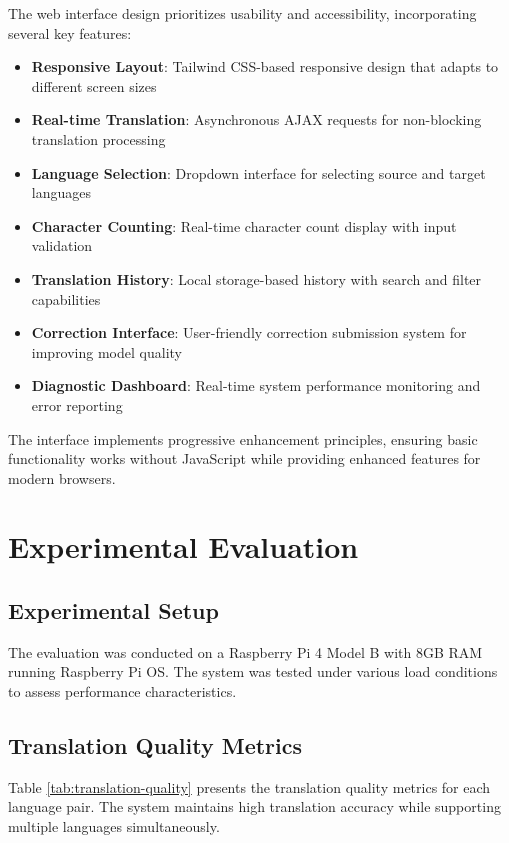 \documentclass[conference]{IEEEtran}
\begin{document}
The web interface design prioritizes usability and accessibility, incorporating several key features:

\begin{itemize}
    \item \textbf{Responsive Layout}: Tailwind CSS-based responsive design that adapts to different screen sizes
    \item \textbf{Real-time Translation}: Asynchronous AJAX requests for non-blocking translation processing
    \item \textbf{Language Selection}: Dropdown interface for selecting source and target languages
    \item \textbf{Character Counting}: Real-time character count display with input validation
    \item \textbf{Translation History}: Local storage-based history with search and filter capabilities
    \item \textbf{Correction Interface}: User-friendly correction submission system for improving model quality
    \item \textbf{Diagnostic Dashboard}: Real-time system performance monitoring and error reporting
\end{itemize}

The interface implements progressive enhancement principles, ensuring basic functionality works without JavaScript while providing enhanced features for modern browsers.

\section{Experimental Evaluation}

\subsection{Experimental Setup}

The evaluation was conducted on a Raspberry Pi 4 Model B with 8GB RAM running Raspberry Pi OS. The system was tested under various load conditions to assess performance characteristics.

\subsection{Translation Quality Metrics}

Table \ref{tab:translation-quality} presents the translation quality metrics for each language pair. The system maintains high translation accuracy while supporting multiple languages simultaneously.
\end{document}
